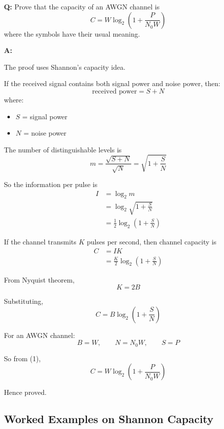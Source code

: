 \documentclass[11pt,a4paper]{book}
\newcounter{qna}[chapter]
\renewcommand{\theqna}{\thechapter.\arabic{qna}}
\newenvironment{questionanswerbox}[1][Example]{%
    \refstepcounter{qna}
    \begin{tcolorbox}[
        enhanced,
        breakable,
        colback=softlavender!10,
        colframe=softlavender!200,
        title={#1~\theqna},
        fonttitle=\bfseries,
        coltitle=white,
        colbacktitle=softlavender!200,
        sharp corners,
        boxrule=1pt,
        left=8pt,
        right=8pt,
        top=6pt,
        bottom=6pt
    ]
}{\end{tcolorbox}}
\begin{document}
\begin{questionanswerbox}[Proving the Capacity of AWGN Channel Example]
\textbf{Q:} Prove that the capacity of an AWGN channel is
\[
C=W\log_2\!\left(1+\frac{P}{N_0W}\right)
\]
where the symbols have their usual meaning.

\textbf{A:}

The proof uses Shannon's capacity idea.

If the received signal contains both signal power and noise power, then:
\[
\text{received power}=S+N
\]
where:
\begin{itemize}
    \item \(S\) = signal power
    \item \(N\) = noise power
\end{itemize}

The number of distinguishable levels is
\[
m=\frac{\sqrt{S+N}}{\sqrt{N}}=\sqrt{1+\frac{S}{N}} \tag{i}
\]

So the information per pulse is
\begin{align*}
I&=\log_2 m\\
 &=\log_2\sqrt{1+\frac{S}{N}}\\
 &=\frac{1}{2}\log_2\!\left(1+\frac{S}{N}\right) \tag{ii}
\end{align*}

If the channel transmits \(K\) pulses per second, then channel capacity is
\begin{align*}
C&=IK\\
 &=\frac{K}{2}\log_2\!\left(1+\frac{S}{N}\right)
\end{align*}

From Nyquist theorem,
\[
K=2B \tag{iii}
\]

Substituting,
\[
C=B\log_2\!\left(1+\frac{S}{N}\right) \tag{1}
\]

For an AWGN channel:
\[
B=W,\qquad N=N_0W,\qquad S=P
\]

So from (1),
\[
C=W\log_2\!\left(1+\frac{P}{N_0W}\right)
\]

Hence proved.
\end{questionanswerbox}

\subsection{Worked Examples on Shannon Capacity}
\end{document}
